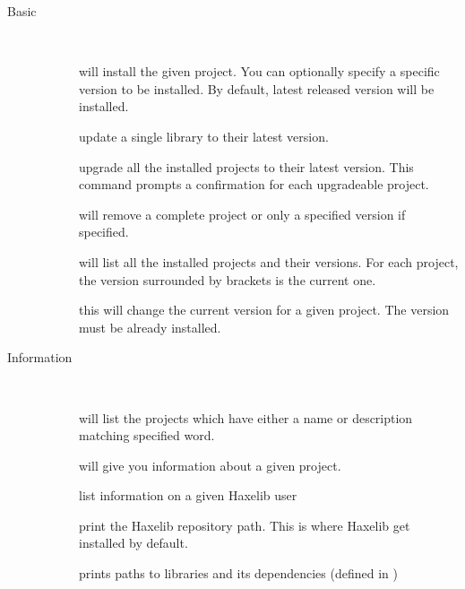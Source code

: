 \begin{description}
	\item[Basic] \\
		\begin{description}
			\item[] will install the given project. You can optionally specify a specific version to be installed. By default, latest released version will be installed.
			\item[] update a single library to their latest version. 
			\item[] upgrade all the installed projects to their latest version. This command prompts a confirmation for each upgradeable project.
			\item[] will remove a complete project or only a specified version if specified.
			\item[] will list all the installed projects and their versions. For each project, the version surrounded by brackets is the current one.
			\item[] this will change the current version for a given project. The version must be already installed.
		\end{description}
		
	\item[Information] \\
		\begin{description}
			\item[] will list the projects which have either a name or description matching specified word.
			\item[] will give you information about a given project.
			\item[] list information on a given Haxelib user
			\item[] print the Haxelib repository path. This is where Haxelib get installed by default.
			\item[] prints paths to libraries and its dependencies (defined in )
		\end{description}
		

\end{description}
